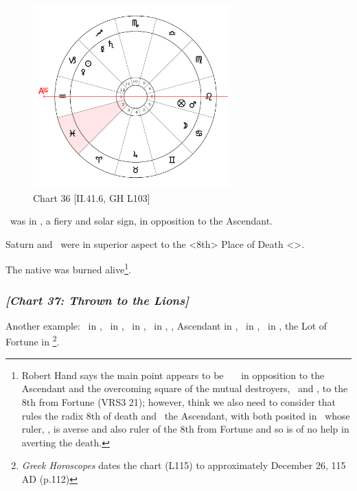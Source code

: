 \clearpage
\begin{figure}
\centering
\vspace{-20pt}
\includegraphics[width=0.68\textwidth]{charts/2_41_6}
\caption{Chart 36 [II.41.6, GH L103]}
\label{fig:chart36}
\end{figure}

\noindent \Mars\, was in \Leo, a fiery and solar sign, in opposition to the Ascendant. 

Saturn and \Mercury\, were in superior aspect to the <8th> Place of Death <\Pisces>. 

The native was burned alive\footnote{Robert Hand says the main point appears to be \Mars\, \Conjunction\, \Fortune\, in opposition to the Ascendant and the overcoming square of the mutual destroyers, \Mercury\, and \Saturn, to the 8th from Fortune (VRS3 21); however, think we  also need to consider that \Mercury\, rules the radix 8th of death  and \Saturn\, the Ascendant, with both posited in \Sagittarius\, whose ruler, \Jupiter, is averse and also ruler of the 8th from Fortune  and so is of no help in averting the death.}.
\newpage
\subsubsection{\textit{[Chart 37: Thrown to the Lions]}}
Another example: \Sun\, in \Capricorn, \Moon\, in \Libra, \Saturn\, in \Taurus, \Jupiter\, in \Gemini, \Mars, Ascendant in \Cancer, \Venus\, in \Aquarius, \Mercury\, in \Sagittarius, the Lot of Fortune in \Libra
\footnote{\textit{Greek Horoscopes} dates the chart (L115) to approximately December 26, 115 AD (p.112)}. 

